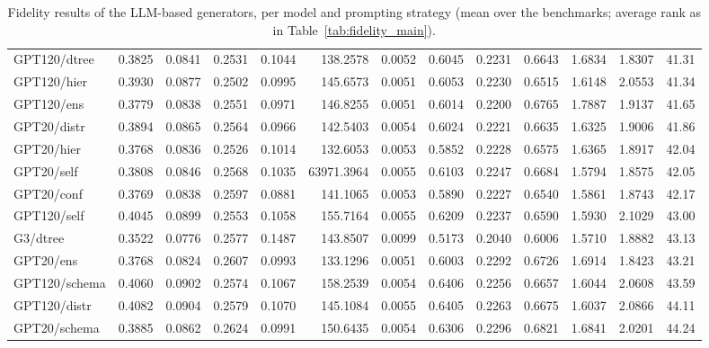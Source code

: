 \begin{table}[t]
\begin{tabular}{lrrrrrrrrrrrr}
GPT120/dtree & 0.3825 & 0.0841 & 0.2531 & 0.1044 & 138.2578 & 0.0052 & 0.6045 & 0.2231 & 0.6643 & 1.6834 & 1.8307 & 41.31 \\
GPT120/hier & 0.3930 & 0.0877 & 0.2502 & 0.0995 & 145.6573 & 0.0051 & 0.6053 & 0.2230 & 0.6515 & 1.6148 & 2.0553 & 41.34 \\
GPT120/ens & 0.3779 & 0.0838 & 0.2551 & 0.0971 & 146.8255 & 0.0051 & 0.6014 & 0.2200 & 0.6765 & 1.7887 & 1.9137 & 41.65 \\
GPT20/distr & 0.3894 & 0.0865 & 0.2564 & 0.0966 & 142.5403 & 0.0054 & 0.6024 & 0.2221 & 0.6635 & 1.6325 & 1.9006 & 41.86 \\
GPT20/hier & 0.3768 & 0.0836 & 0.2526 & 0.1014 & 132.6053 & 0.0053 & 0.5852 & 0.2228 & 0.6575 & 1.6365 & 1.8917 & 42.04 \\
GPT20/self & 0.3808 & 0.0846 & 0.2568 & 0.1035 & 63971.3964 & 0.0055 & 0.6103 & 0.2247 & 0.6684 & 1.5794 & 1.8575 & 42.05 \\
GPT20/conf & 0.3769 & 0.0838 & 0.2597 & 0.0881 & 141.1065 & 0.0053 & 0.5890 & 0.2227 & 0.6540 & 1.5861 & 1.8743 & 42.17 \\
GPT120/self & 0.4045 & 0.0899 & 0.2553 & 0.1058 & 155.7164 & 0.0055 & 0.6209 & 0.2237 & 0.6590 & 1.5930 & 2.1029 & 43.00 \\
G3/dtree & 0.3522 & 0.0776 & 0.2577 & 0.1487 & 143.8507 & 0.0099 & 0.5173 & 0.2040 & 0.6006 & 1.5710 & 1.8882 & 43.13 \\
GPT20/ens & 0.3768 & 0.0824 & 0.2607 & 0.0993 & 133.1296 & 0.0051 & 0.6003 & 0.2292 & 0.6726 & 1.6914 & 1.8423 & 43.21 \\
GPT120/schema & 0.4060 & 0.0902 & 0.2574 & 0.1067 & 158.2539 & 0.0054 & 0.6406 & 0.2256 & 0.6657 & 1.6044 & 2.0608 & 43.59 \\
GPT120/distr & 0.4082 & 0.0904 & 0.2579 & 0.1070 & 145.1084 & 0.0055 & 0.6405 & 0.2263 & 0.6675 & 1.6037 & 2.0866 & 44.11 \\
GPT20/schema & 0.3885 & 0.0862 & 0.2624 & 0.0991 & 150.6435 & 0.0054 & 0.6306 & 0.2296 & 0.6821 & 1.6841 & 2.0201 & 44.24 \\
\bottomrule
\end{tabular}
\caption{Fidelity results of the LLM-based generators, per model and prompting strategy (mean over the benchmarks; average rank as in Table~\ref{tab:fidelity_main}).}
\label{tab:fidelity_llm}
\end{table}